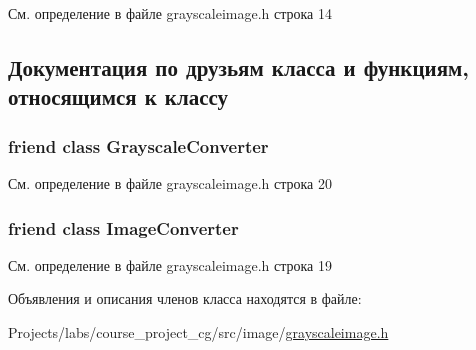 См. определение в файле grayscaleimage.\+h строка 14



\subsection{Документация по друзьям класса и функциям, относящимся к классу}
\subsubsection[{\texorpdfstring{Grayscale\+Converter}{GrayscaleConverter}}]{\setlength{\rightskip}{0pt plus 5cm}friend class Grayscale\+Converter\hspace{0.3cm}{\ttfamily [friend]}}\hypertarget{class_grayscale_image_a655e20b76703bb6a4e6ecd9ed4a5d9ed}{}\label{class_grayscale_image_a655e20b76703bb6a4e6ecd9ed4a5d9ed}


См. определение в файле grayscaleimage.\+h строка 20

\subsubsection[{\texorpdfstring{Image\+Converter}{ImageConverter}}]{\setlength{\rightskip}{0pt plus 5cm}friend class {\bf Image\+Converter}\hspace{0.3cm}{\ttfamily [friend]}}\hypertarget{class_grayscale_image_a683b929065aaead03ccce450a7b4ab30}{}\label{class_grayscale_image_a683b929065aaead03ccce450a7b4ab30}


См. определение в файле grayscaleimage.\+h строка 19



Объявления и описания членов класса находятся в файле\+:\begin{DoxyCompactItemize}
\item 
Projects/labs/course\+\_\+project\+\_\+cg/src/image/\hyperlink{grayscaleimage_8h}{grayscaleimage.\+h}\end{DoxyCompactItemize}
